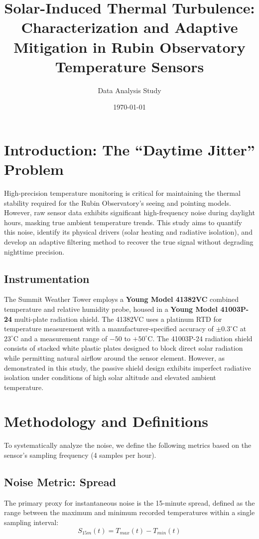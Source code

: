 \documentclass{article}
\title{\textbf{Solar-Induced Thermal Turbulence: Characterization and Adaptive Mitigation in Rubin Observatory Temperature Sensors}}
\author{Data Analysis Study}
\date{\today}
\begin{document}
\maketitle

\section{Introduction: The ``Daytime Jitter'' Problem}
High-precision temperature monitoring is critical for maintaining the thermal stability required for the Rubin Observatory's seeing and pointing models. However, raw sensor data exhibits significant high-frequency noise during daylight hours, masking true ambient temperature trends. This study aims to quantify this noise, identify its physical drivers (solar heating and radiative isolation), and develop an adaptive filtering method to recover the true signal without degrading nighttime precision.

\subsection{Instrumentation}
The Summit Weather Tower employs a \textbf{Young Model 41382VC} combined temperature and relative humidity probe, housed in a \textbf{Young Model 41003P-24} multi-plate radiation shield. The 41382VC uses a platinum RTD for temperature measurement with a manufacturer-specified accuracy of $\pm 0.3^\circ$C at $23^\circ$C and a measurement range of $-50$ to $+50^\circ$C. The 41003P-24 radiation shield consists of stacked white plastic plates designed to block direct solar radiation while permitting natural airflow around the sensor element. However, as demonstrated in this study, the passive shield design exhibits imperfect radiative isolation under conditions of high solar altitude and elevated ambient temperature.

\section{Methodology and Definitions}
To systematically analyze the noise, we define the following metrics based on the sensor's sampling frequency (4 samples per hour).

\subsection{Noise Metric: Spread}
The primary proxy for instantaneous noise is the 15-minute spread, defined as the range between the maximum and minimum recorded temperatures within a single sampling interval:
\begin{equation}
    S_{15m}(t) = T_{max}(t) - T_{min}(t)
\end{equation}
\end{document}
